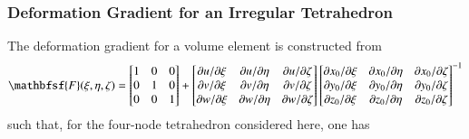 \subsubsection{Deformation Gradient for an Irregular Tetrahedron}

The deformation gradient for a volume element is constructed from
\begin{equation}
    \mathbfsf{F} ( \xi , \eta , \zeta ) = \begin{bmatrix} 1 & 0 & 0 \\
    0 & 1 & 0 \\ 0 & 0 & 1 \end{bmatrix} + \begin{bmatrix}
    \partial u / \partial \xi & \partial u / \partial \eta & \partial u / \partial \zeta \\
    \partial v / \partial \xi & \partial v / \partial \eta & \partial v / \partial \zeta \\
    \partial w / \partial \xi & \partial w / \partial \eta & \partial w / \partial \zeta
    \end{bmatrix} \begin{bmatrix}
    \partial x_0 / \partial \xi & \partial x_0 / \partial \eta & \partial x_0 / \partial \zeta \\
    \partial y_0 / \partial \xi & \partial y_0 / \partial \eta & \partial y_0 / \partial \zeta \\
    \partial z_0 / \partial \xi & \partial z_0 / \partial \eta & \partial z_0 / \partial \zeta
    \end{bmatrix}^{-1}
\end{equation}
such that, for the four-node tetrahedron considered here, one has
